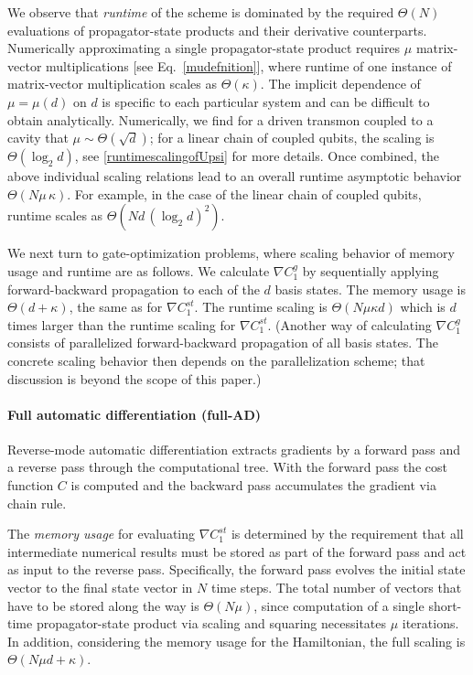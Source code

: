 We observe that \textit{runtime} of the scheme is dominated by the required $\Theta(N)$ evaluations of propagator-state products and their derivative counterparts. Numerically approximating a single propagator-state product requires $\mu$ matrix-vector multiplications [see Eq.\ \eqref{mudefnition}], where runtime of one instance of matrix-vector multiplication scales as $\Theta(\kappa)$.  The implicit dependence of $\mu=\mu(d)$ on $d$ is specific to each particular system and can be difficult to obtain analytically. Numerically, we find for a driven transmon coupled to a cavity that $\mu\sim\Theta(\sqrt{d})$; for a linear chain of coupled qubits, the scaling is $\Theta(\log_2 d)$, see  \ref{runtimescalingofUpsi} for more details. 
Once combined, the above individual scaling relations lead to an overall runtime asymptotic behavior 
$\Theta(N\mu\, \kappa)$. For example, in the case of the linear chain of coupled qubits, runtime scales as $\Theta(Nd\, (\log_2 d )^2)$.

We next turn to gate-optimization problems, where scaling behavior of memory usage and runtime are as follows. We calculate $\nabla C_1^{ g}$ by sequentially 
applying forward-backward propagation to each of the $d$ basis states. The memory usage is $\Theta(d+\kappa)$, the same as for $\nabla C_1^{st}$. The runtime scaling is $\Theta(N\mu\kappa d)$ which is $d$ times larger than the runtime scaling for $\nabla C_1^{st}$. (Another way of calculating $\nabla C_1^{ g}$ consists of parallelized forward-backward propagation of all basis states. The concrete scaling behavior then depends on the parallelization scheme; that discussion is beyond the scope of this paper.)



\paragraph{Full automatic differentiation (full-AD)}
Reverse-mode automatic differentiation extracts gradients by a forward pass and a reverse pass through the computational tree. With the forward pass the cost function $C$ is computed and the backward pass accumulates the gradient via chain rule.

The \textit{memory usage} for evaluating $\nabla C_1^{st}$ is determined by the requirement that all intermediate numerical results must be stored as part of the forward pass and act as input to the reverse pass. Specifically, the forward pass evolves the initial state vector to the final state vector in $N$ time steps. The total number of vectors that have to be stored along the way is $\Theta
(N\mu)$, since computation of a single short-time propagator-state product via scaling and squaring necessitates $\mu$ iterations. In addition, considering the memory usage for the Hamiltonian, the full scaling is $\Theta(N\mu d +\kappa)$. 

